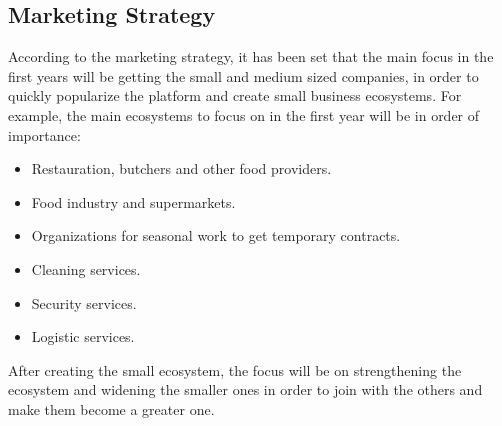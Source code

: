 \documentclass[./main.tex]{subfiles}
\begin{document}
\subsection{Marketing Strategy}
According to the marketing strategy, it has been set that the main focus in the first years will be getting the small and medium sized companies, in order to quickly popularize the platform and create small business ecosystems. For example, the main ecosystems to focus on in the first year will be in order of importance:
\begin{itemize}
	\item Restauration, butchers and other food providers.
	\item Food industry and supermarkets.
	\item Organizations for seasonal work to get temporary contracts.
	\item Cleaning services.
	\item Security services.
	\item Logistic services.
\end{itemize}
After creating the small ecosystem, the focus will be on strengthening the ecosystem and widening the smaller ones in order to join with the others and make them become a greater one.
\end{document}
